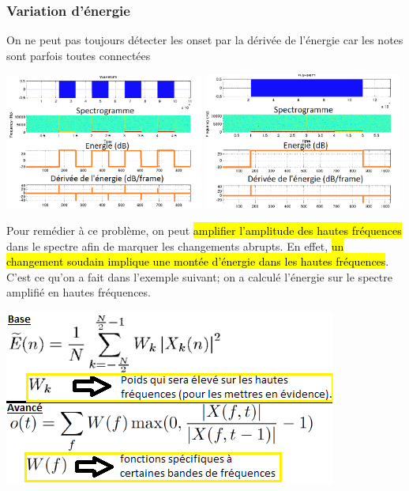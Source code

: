\documentclass[letterpaper, 12pt]{article}
\newcommand{\alinea}{
\hspace*{0.5cm}}
\begin{document}
			\subsubsection{Variation d'énergie}
				\alinea On ne peut pas toujours détecter les onset par la dérivée de l'énergie car les notes sont parfois toutes
					connectées
				\begin{center}
					\includegraphics[width=0.49\textwidth]{Images/onset-ex} \includegraphics[width=0.49\textwidth]{Images/onset-ex2}
				\end{center}
				\alinea Pour remédier à ce problème, on peut \hl{amplifier l'amplitude des hautes fréquences} dans le spectre afin de 
					marquer les changements abrupts. En effet, \hl{un changement soudain implique une montée d'énergie dans les hautes
					fréquences}. C'est ce qu'on a fait dans l'exemple suivant; on a calculé l'énergie sur le spectre amplifié en hautes
					fréquences. \\
				\begin{minipage}{0.49\textwidth}
					\includegraphics[width=\textwidth]{Images/onset-eq1}
				\end{minipage} \hfill
\end{document}
